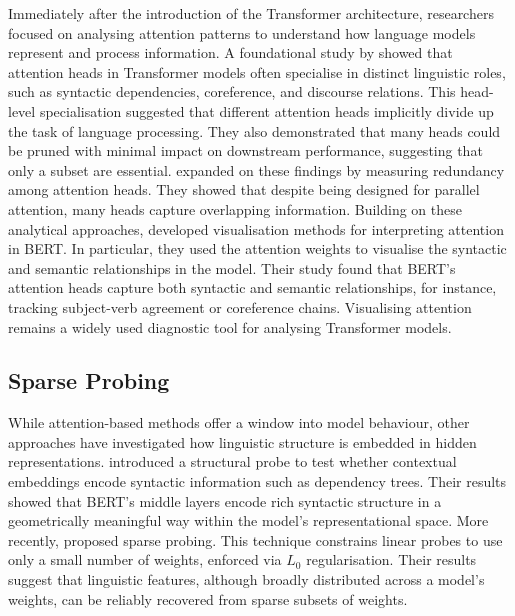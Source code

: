 Immediately after the introduction of the Transformer architecture, researchers focused on analysing attention patterns to understand how language models represent and process information. A foundational study by \citet{voita2019analyzing} showed that attention heads in Transformer models often specialise in distinct linguistic roles, such as syntactic dependencies, coreference, and discourse relations. This head-level specialisation suggested that different attention heads implicitly divide up the task of language processing. They also demonstrated that many heads could be pruned with minimal impact on downstream performance, suggesting that only a subset are essential. \citet{michel2019sixteen} expanded on these findings by measuring redundancy among attention heads. They showed that despite being designed for parallel attention, many heads capture overlapping information. Building on these analytical approaches, \citet{clark2019does} developed visualisation methods for interpreting attention in BERT. In particular, they used the attention weights to visualise the syntactic and semantic relationships in the model. Their study found that BERT's attention heads capture both syntactic and semantic relationships, for instance, tracking subject-verb agreement or coreference chains. Visualising attention remains a widely used diagnostic tool for analysing Transformer models. 

\subsection{Sparse Probing}

While attention-based methods offer a window into model behaviour, other approaches have investigated how linguistic structure is embedded in hidden representations. \citet{hewitt2019structural} introduced a structural probe to test whether contextual embeddings encode syntactic information such as dependency trees. Their results showed that BERT's middle layers encode rich syntactic structure in a geometrically meaningful way within the model's representational space. More recently, \citet{gurnee2023finding} proposed sparse probing. This technique constrains linear probes to use only a small number of weights, enforced via $L_0$ regularisation. Their results suggest that linguistic features, although broadly distributed across a model's weights, can be reliably recovered from sparse subsets of weights. %

